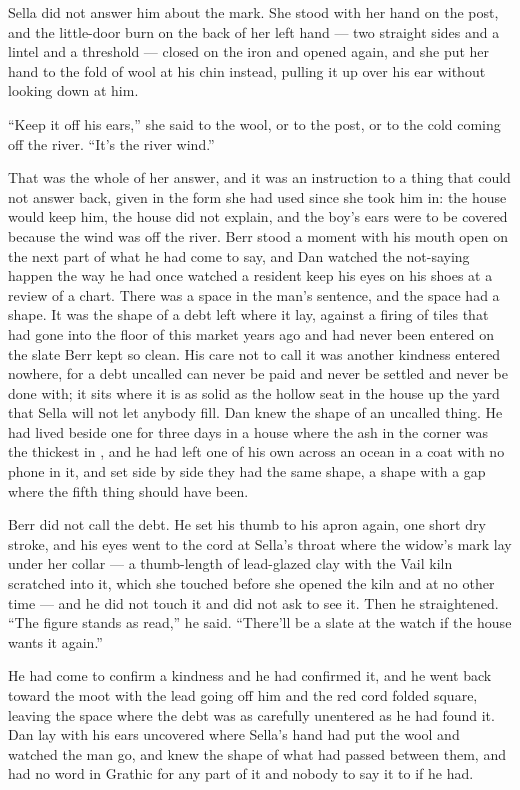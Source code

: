 Sella did not answer him about the mark. She stood with her hand on the post, and the little-door burn on the back of her left hand — two straight sides and a lintel and a threshold — closed on the iron and opened again, and she put her hand to the fold of wool at his chin instead, pulling it up over his ear without looking down at him.

“Keep it off his ears,” she said to the wool, or to the post, or to the cold coming off the river. “It's the river wind.”

That was the whole of her answer, and it was an instruction to a thing that could not answer back, given in the form she had used since she took him in: the house would keep him, the house did not explain, and the boy's ears were to be covered because the wind was off the river. Berr stood a moment with his mouth open on the next part of what he had come to say, and Dan watched the not-saying happen the way he had once watched a resident keep his eyes on his shoes at a review of a chart. There was a space in the man's sentence, and the space had a shape. It was the shape of a debt left where it lay, against a firing of tiles that had gone into the floor of this market years ago and had never been entered on the slate Berr kept so clean. His care not to call it was another kindness entered nowhere, for a debt uncalled can never be paid and never be settled and never be done with; it sits where it is as solid as the hollow seat in the house up the yard that Sella will not let anybody fill. Dan knew the shape of an uncalled thing. He had lived beside one for three days in a house where the ash in the corner was the thickest in , and he had left one of his own across an ocean in a coat with no phone in it, and set side by side they had the same shape, a shape with a gap where the fifth thing should have been.

Berr did not call the debt. He set his thumb to his apron again, one short dry stroke, and his eyes went to the cord at Sella's throat where the widow's mark lay under her collar — a thumb-length of lead-glazed clay with the Vail kiln scratched into it, which she touched before she opened the kiln and at no other time — and he did not touch it and did not ask to see it. Then he straightened. “The figure stands as read,” he said. “There'll be a slate at the watch if the house wants it again.”

He had come to confirm a kindness and he had confirmed it, and he went back toward the moot with the lead going off him and the red cord folded square, leaving the space where the debt was as carefully unentered as he had found it. Dan lay with his ears uncovered where Sella's hand had put the wool and watched the man go, and knew the shape of what had passed between them, and had no word in Grathic for any part of it and nobody to say it to if he had.

